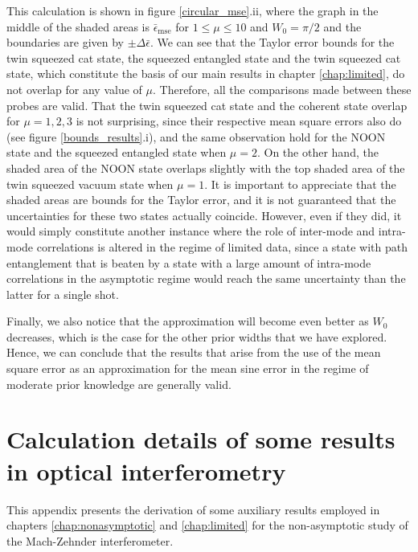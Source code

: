 This calculation is shown in figure \ref{circular_mse}.ii, where the graph in the middle of the shaded areas is $\bar{\epsilon}_{\mathrm{mse}}$ for $1\leqslant\mu \leqslant 10$ and $W_0 = \pi/2$ and the boundaries are given by $\pm \Delta \bar{\epsilon}$. We can see that the Taylor error bounds for the twin squeezed cat state, the squeezed entangled state and the twin squeezed cat state, which constitute the basis of our main results in chapter \ref{chap:limited}, do not overlap for any value of $\mu$. Therefore, all the comparisons made between these probes are valid. That the twin squeezed cat state and the coherent state overlap for $\mu = 1, 2, 3$ is not surprising, since their respective mean square errors also do (see figure \ref{bounds_results}.i), and the same observation hold for the NOON state and the squeezed entangled state when $\mu = 2$. On the other hand, the shaded area of the NOON state overlaps slightly with the top shaded area of the twin squeezed vacuum state when $\mu=1$. It is important to appreciate that the shaded areas are bounds for the Taylor error, and it is not guaranteed that the uncertainties for these two states actually coincide. However, even if they did, it would simply constitute another instance where the role of inter-mode and intra-mode correlations is altered in the regime of limited data, since a state with path entanglement that is beaten by a state with a large amount of intra-mode correlations in the asymptotic regime would reach the same uncertainty than the latter for a single shot. 

Finally, we also notice that the approximation will become even better as $W_0$ decreases, which is the case for the other prior widths that we have explored. Hence, we can conclude that the results that arise from the use of the mean square error as an approximation for the mean sine error in the regime of moderate prior knowledge are generally valid.

\section{Calculation details of some results in optical interferometry}
\label{sec:optrans}

This appendix presents the derivation of some auxiliary results employed in chapters \ref{chap:nonasymptotic} and \ref{chap:limited} for the non-asymptotic study of the Mach-Zehnder interferometer.

